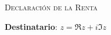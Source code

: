 \documentclass[11pt]{article}
\begin{document}
\begin{center}
    \Large{\textsc{Declaración de la Renta}}
\end{center}

\vspace{2px}

\textbf{Destinatario}: $z = \Re z + i\Im z$

\vspace{2px}
\end{document}

